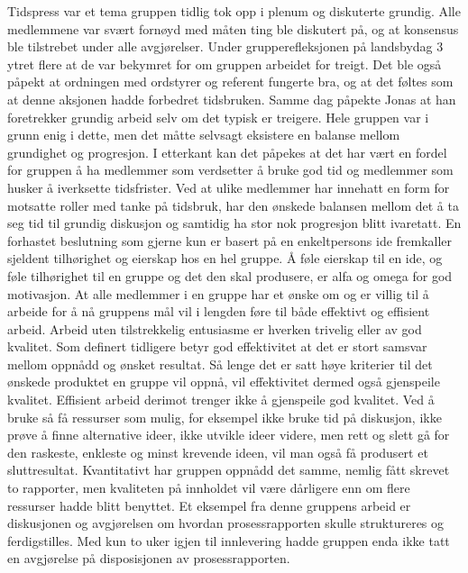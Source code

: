 Tidspress var et tema gruppen tidlig tok opp i plenum og diskuterte grundig.
Alle medlemmene var svært fornøyd med måten ting ble diskutert på, og at konsensus ble tilstrebet under alle avgjørelser. 
Under grupperefleksjonen på landsbydag 3 ytret flere at de var bekymret for om gruppen arbeidet for treigt.
Det ble også påpekt at ordningen med ordstyrer og referent fungerte bra, og at det føltes som at denne aksjonen hadde forbedret tidsbruken.
Samme dag påpekte Jonas at han foretrekker grundig arbeid selv om det typisk er treigere.
Hele gruppen var i grunn enig i dette, men det måtte selvsagt eksistere en balanse mellom grundighet og progresjon.
I etterkant kan det påpekes at det har vært en fordel for gruppen å ha medlemmer som verdsetter å bruke god tid og medlemmer som husker å iverksette tidsfrister.
Ved at ulike medlemmer har innehatt en form for motsatte roller med tanke på tidsbruk, har den ønskede balansen mellom det å ta seg tid til grundig diskusjon og samtidig ha stor nok progresjon blitt ivaretatt. 
En forhastet beslutning som gjerne kun er basert på en enkeltpersons ide fremkaller sjeldent tilhørighet og eierskap hos en hel gruppe.
Å føle eierskap til en ide, og føle tilhørighet til en gruppe og det den skal produsere, er alfa og omega for god motivasjon.
At alle medlemmer i en gruppe har et ønske om og er villig til å arbeide for å nå gruppens mål vil i lengden føre til både effektivt og effisient arbeid.
Arbeid uten tilstrekkelig entusiasme er hverken trivelig eller av god kvalitet.
Som definert tidligere betyr god effektivitet at det er stort samsvar mellom oppnådd og ønsket resultat.
Så lenge det er satt høye kriterier til det ønskede produktet en gruppe vil oppnå, vil effektivitet dermed også gjenspeile kvalitet.
Effisient arbeid derimot trenger ikke å gjenspeile god kvalitet.
Ved å bruke så få ressurser som mulig, for eksempel ikke bruke tid på diskusjon, ikke prøve å finne alternative ideer, ikke utvikle ideer videre, men rett og slett gå for den raskeste, enkleste og minst krevende ideen, vil man også få produsert et sluttresultat.
Kvantitativt har gruppen oppnådd det samme, nemlig fått skrevet to rapporter, men kvaliteten på innholdet vil være dårligere enn om flere ressurser hadde blitt benyttet.
Et eksempel fra denne gruppens arbeid er diskusjonen og avgjørelsen om hvordan prosessrapporten skulle struktureres og ferdigstilles.
Med kun to uker igjen til innlevering hadde gruppen enda ikke tatt en avgjørelse på disposisjonen av prosessrapporten.
